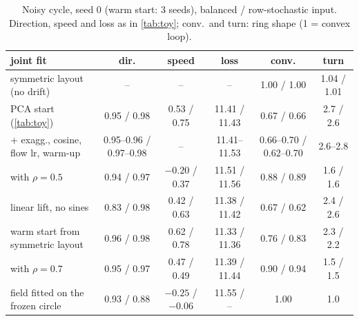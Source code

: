 \begin{table}[h]
  \caption{Noisy cycle, seed 0 (warm start: 3 seeds), balanced / row-stochastic input.
  Direction, speed and loss as in \cref{tab:toy}; conv.\ and turn: ring shape (1 = convex loop).}
  \label{tab:fold}
  \centering
  \small
  \setlength{\tabcolsep}{3pt}
  \begin{tabular}{lccccc}
    \toprule
    joint fit & dir. & speed & loss & conv. & turn \\
    \midrule
    symmetric layout (no drift) & -- & -- & -- & 1.00 / 1.00 & 1.04 / 1.01 \\
    PCA start (\cref{tab:toy}) & 0.95 / 0.98 & 0.53 / 0.75 & 11.41 / 11.43 & 0.67 / 0.66 & 2.7 / 2.6 \\
    \quad + exagg., cosine, flow lr, warm-up & 0.95--0.96 / 0.97--0.98 & -- & 11.41--11.53 & 0.66--0.70 / 0.62--0.70 & 2.6--2.8 \\
    \quad with $\rho=0.5$ & 0.94 / 0.97 & $-0.20$ / 0.37 & 11.51 / 11.56 & 0.88 / 0.89 & 1.6 / 1.6 \\
    \quad linear lift, no sines & 0.83 / 0.98 & 0.42 / 0.63 & 11.38 / 11.42 & 0.67 / 0.62 & 2.4 / 2.6 \\
    warm start from symmetric layout & 0.96 / 0.98 & 0.62 / 0.78 & 11.33 / 11.36 & 0.76 / 0.83 & 2.3 / 2.2 \\
    \quad with $\rho=0.7$ & 0.95 / 0.97 & 0.47 / 0.49 & 11.39 / 11.44 & 0.90 / 0.94 & 1.5 / 1.5 \\
    field fitted on the frozen circle & 0.93 / 0.88 & $-0.25$ / $-0.06$ & 11.55 / -- & 1.00 & 1.0 \\
    \bottomrule
  \end{tabular}
\end{table}

